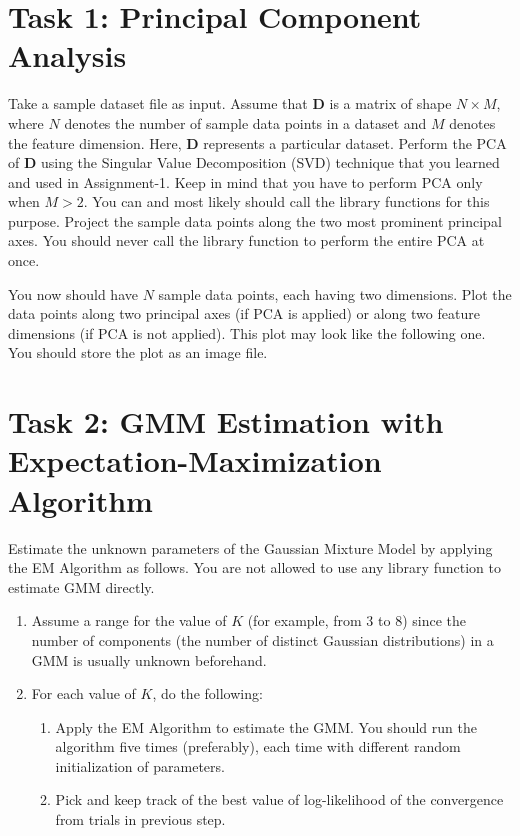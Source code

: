 \documentclass[11pt, a4paper]{article}
\begin{document}
\section{Task 1: Principal Component Analysis}
Take a sample dataset file as input. Assume that $\mathbf{D}$ is a matrix of shape $N \times M$, where $N$ denotes the number of sample data points in a dataset and $M$ denotes the feature dimension. Here, $\mathbf{D}$ represents a particular dataset. Perform the PCA of $\mathbf{D}$ using the Singular Value Decomposition (SVD) technique that you learned and used in Assignment-1. Keep in mind that you have to perform PCA only when $M > 2$. You can and most likely should call the library functions for this purpose. Project the sample data points along the two most prominent principal axes. You should never call the library function to perform the entire PCA at once.

You now should have $N$ sample data points, each having two dimensions. Plot the data points along two principal axes (if PCA is applied) or along two feature dimensions (if PCA is not applied). This plot may look like the following one. You should store the plot as an image file.

\section{Task 2: GMM Estimation with Expectation-Maximization Algorithm}
Estimate the unknown parameters of the Gaussian Mixture Model by applying the EM Algorithm as follows. You are not allowed to use any library function to estimate GMM directly.

\begin{enumerate}
    \item Assume a range for the value of $K$ (for example, from 3 to 8) since the number of components (the number of distinct Gaussian distributions) in a GMM is usually unknown beforehand.
    \item For each value of $K$, do the following:
    \begin{enumerate}
        \item Apply the EM Algorithm to estimate the GMM. You should run the algorithm five times (preferably), each time with different random initialization of parameters.
        \item Pick and keep track of the best value of log-likelihood of the convergence from trials in previous step.
    \end{enumerate}
\end{enumerate}
\end{document}
